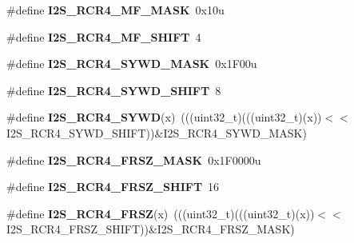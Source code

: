 \begin{DoxyCompactItemize}
\item 
\#define {\bfseries I2\+S\+\_\+\+R\+C\+R4\+\_\+\+M\+F\+\_\+\+M\+A\+SK}~0x10u\hypertarget{group__I2S__Register__Masks_ga7256d017dda987fcd8ac9daae80208b7}{}\label{group__I2S__Register__Masks_ga7256d017dda987fcd8ac9daae80208b7}

\item 
\#define {\bfseries I2\+S\+\_\+\+R\+C\+R4\+\_\+\+M\+F\+\_\+\+S\+H\+I\+FT}~4\hypertarget{group__I2S__Register__Masks_gace2764bf30039c2f06ef202b86052ba4}{}\label{group__I2S__Register__Masks_gace2764bf30039c2f06ef202b86052ba4}

\item 
\#define {\bfseries I2\+S\+\_\+\+R\+C\+R4\+\_\+\+S\+Y\+W\+D\+\_\+\+M\+A\+SK}~0x1\+F00u\hypertarget{group__I2S__Register__Masks_ga1fb484ccadebeaab844b5dcfa0c89950}{}\label{group__I2S__Register__Masks_ga1fb484ccadebeaab844b5dcfa0c89950}

\item 
\#define {\bfseries I2\+S\+\_\+\+R\+C\+R4\+\_\+\+S\+Y\+W\+D\+\_\+\+S\+H\+I\+FT}~8\hypertarget{group__I2S__Register__Masks_ga5ad9893dd40464452393719f845ae58d}{}\label{group__I2S__Register__Masks_ga5ad9893dd40464452393719f845ae58d}

\item 
\#define {\bfseries I2\+S\+\_\+\+R\+C\+R4\+\_\+\+S\+Y\+WD}(x)~(((uint32\+\_\+t)(((uint32\+\_\+t)(x))$<$$<$I2\+S\+\_\+\+R\+C\+R4\+\_\+\+S\+Y\+W\+D\+\_\+\+S\+H\+I\+FT))\&I2\+S\+\_\+\+R\+C\+R4\+\_\+\+S\+Y\+W\+D\+\_\+\+M\+A\+SK)\hypertarget{group__I2S__Register__Masks_ga500886836a634bbb05fe4c03b091c2b9}{}\label{group__I2S__Register__Masks_ga500886836a634bbb05fe4c03b091c2b9}

\item 
\#define {\bfseries I2\+S\+\_\+\+R\+C\+R4\+\_\+\+F\+R\+S\+Z\+\_\+\+M\+A\+SK}~0x1\+F0000u\hypertarget{group__I2S__Register__Masks_ga8eda652c5a5ee719963f7103561bdc73}{}\label{group__I2S__Register__Masks_ga8eda652c5a5ee719963f7103561bdc73}

\item 
\#define {\bfseries I2\+S\+\_\+\+R\+C\+R4\+\_\+\+F\+R\+S\+Z\+\_\+\+S\+H\+I\+FT}~16\hypertarget{group__I2S__Register__Masks_gaae89e490a3b7562ea1a9a2992a6a97a7}{}\label{group__I2S__Register__Masks_gaae89e490a3b7562ea1a9a2992a6a97a7}

\item 
\#define {\bfseries I2\+S\+\_\+\+R\+C\+R4\+\_\+\+F\+R\+SZ}(x)~(((uint32\+\_\+t)(((uint32\+\_\+t)(x))$<$$<$I2\+S\+\_\+\+R\+C\+R4\+\_\+\+F\+R\+S\+Z\+\_\+\+S\+H\+I\+FT))\&I2\+S\+\_\+\+R\+C\+R4\+\_\+\+F\+R\+S\+Z\+\_\+\+M\+A\+SK)\hypertarget{group__I2S__Register__Masks_ga9fe4075aea194d85306a3f92420895f3}{}\label{group__I2S__Register__Masks_ga9fe4075aea194d85306a3f92420895f3}


\end{DoxyCompactItemize}
